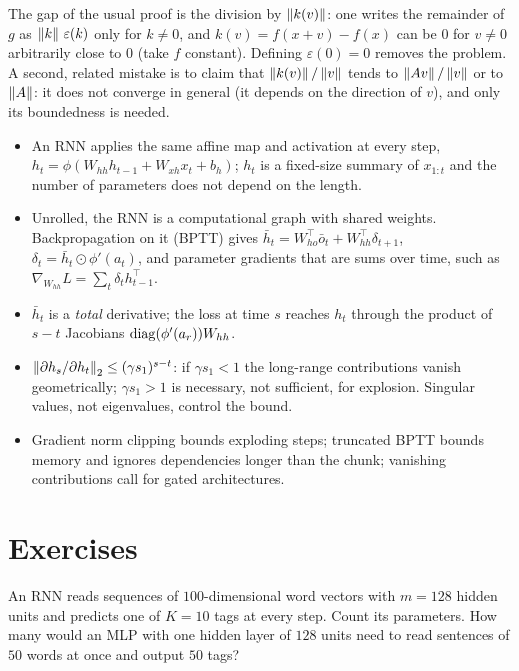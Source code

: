 \begin{notechapter}
The gap of the usual proof is the division by $\left\|k(v)\right\|$: one writes the remainder of $g$ as
$\left\|k\right\|\,\varepsilon(k)$ only for $k\neq0$, and $k(v) = f(x + v) - f(x)$ can be $0$ for $v\neq0$ arbitrarily close to $0$ (take $f$
constant). Defining $\varepsilon(0) = 0$ removes the problem. A second, related mistake is to claim
that $\left\|k(v)\right\|/\left\|v\right\|$ tends to $\left\|Av\right\|/\left\|v\right\|$ or to $\left\|A\right\|$: it does not converge in general (it depends on the
direction of $v$), and only its boundedness is needed.

\begin{chaptersummary}
\begin{itemize}
  \item An RNN applies the same affine map and activation at every step,
        $h_t = \phi(W_{hh}h_{t-1} + W_{xh}x_t + b_h)$; $h_t$ is a fixed-size summary of $x_{1:t}$ and the number of parameters
        does not depend on the length.
  \item Unrolled, the RNN is a computational graph with shared weights. Backpropagation on it
        (BPTT) gives $\bar h_t = W_{ho}^\top\bar o_t + W_{hh}^\top\delta_{t+1}$, $\delta_t = \bar h_t\odot\phi'(a_t)$, and parameter gradients that are
        sums over time, such as $\nabla_{W_{hh}}L = \sum_t\delta_th_{t-1}^\top$.
  \item $\bar h_t$ is a \emph{total} derivative; the loss at time $s$ reaches $h_t$ through the product of
        $s - t$ Jacobians $\operatorname{diag}(\phi'(a_r))W_{hh}$.
  \item $\left\|\partial h_s/\partial h_t\right\|_2\leq(\gamma s_1)^{s-t}$: if $\gamma s_1 < 1$ the long-range contributions vanish
        geometrically; $\gamma s_1 > 1$ is necessary, not sufficient, for explosion. Singular values, not
        eigenvalues, control the bound.
  \item Gradient norm clipping bounds exploding steps; truncated BPTT bounds memory and
        ignores dependencies longer than the chunk; vanishing contributions call for gated
        architectures.
\end{itemize}
\end{chaptersummary}

\section*{Exercises}

\begin{exercise}\label{rnn-bptt:exr:1}
An RNN reads sequences of $100$-dimensional word vectors with $m = 128$ hidden units and
predicts one of $K = 10$ tags at every step. Count its parameters. How many would an MLP with
one hidden layer of $128$ units need to read sentences of $50$ words at once and output
$50$ tags?
\end{exercise}


\end{notechapter}
